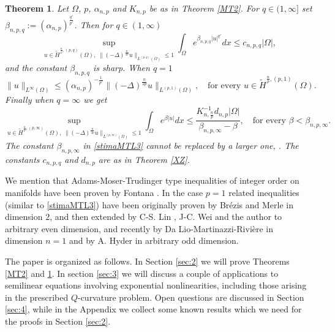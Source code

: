 \documentclass[11pt, a4paper]{article}
\newtheorem{trm}{Theorem}
\begin{document}
\begin{trm}\label{MT3} Let $\Omega$, $p$, $\alpha_{n,p}$ and $K_{n,p}$ be as in Theorem \ref{MT2}. For $q\in (1,\infty]$ set $\beta_{n,p,q}:=(\alpha_{n,p})^\frac{q'}{p'}$.
Then for $q\in (1,\infty)$
\begin{equation}\label{stimaMTL}
\sup_{u\in \tilde H^{\frac{n}{p},(p,q)}(\Omega), \;\|(-\Delta)^{\frac{n}{2p}}u\|_{L^{(p,q)}(\Omega)}\leq 1}\int_{\Omega} e^{\beta_{n,p,q}|u|^{q'}}dx \leq c_{n,p,q}|\Omega|,
\end{equation}
and the constant $\beta_{n,p,q}$ is sharp.
When $q=1$
\begin{equation}\label{stimaMTL2}
\|u\|_{L^\infty(\Omega)}\le (\alpha_{n,p})^{-\frac{1}{p'}} \|(-\Delta)^\frac{n}{2p} u\|_{L^{(p,1)}(\Omega)},\quad \text{for every } u\in \tilde H^{\frac{n}{p},(p,1)}(\Omega).
\end{equation}
Finally when $q=\infty$ we get
\begin{equation}\label{stimaMTL3}
\sup_{u\in \tilde H^{\frac{n}{p},(p,\infty)}(\Omega), \;\|(-\Delta)^{\frac{n}{2p}}u\|_{L^{(p,\infty)}(\Omega)}\leq 1}\int_{\Omega} e^{\beta|u|}dx \leq \frac{K_{n,\frac{n}{p}}^{-1} d_{n,p}|\Omega|}{\beta_{n,p,\infty}-\beta},\quad \text{for every }\beta<\beta_{n,p,\infty}.
\end{equation}
The constant $\beta_{n,p,\infty}$ in \eqref{stimaMTL3} cannot be replaced by a larger one, . The constants $c_{n,p,q}$ and $d_{n,p}$ are as in Theorem \ref{XZ}.
\end{trm}

We mention that Adams-Moser-Trudinger type inequalities of integer order on manifolds have been proven by Fontana \cite{fon}. In the case $p=1$ related inequalities (similar to \eqref{stimaMTL3}) have been originally proven by Br\'ezis and Merle \cite{BM} in dimension $2$, and then extended by C-S. Lin \cite{lin}, J-C. Wei \cite{wei} and the author \cite{mar1} to arbitrary even dimension, and recently by Da Lio-Martinazzi-Rivi\`ere \cite{DLMR} in dimension $n=1$ and by A. Hyder \cite{hyd2} in arbitrary odd dimension.


\medskip

The paper is organized as follows. In Section \ref{sec:2} we will prove Theorems \ref{MT2} and \ref{MT3}. In section \ref{sec:3} we will discuss a couple of applications to semilinear equations involving exponential nonlinearities, including those arising in the prescribed $Q$-curvature problem. Open questions are discussed in Section \ref{sec:4}, while in the Appendix we collect some known results which we need for the proofs in Section \ref{sec:2}.
\end{document}
